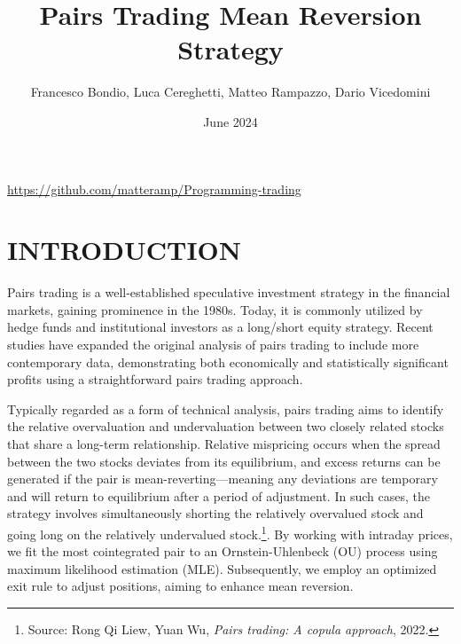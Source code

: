 \documentclass{article}
\title{Pairs Trading Mean Reversion Strategy}
\author{Francesco Bondio, Luca Cereghetti, Matteo Rampazzo, Dario Vicedomini}
\date{June 2024}
\begin{document}
\maketitle  %

\begin{center}
  \small \href{https://github.com/matteramp/Programming-trading}{https://github.com/matteramp/Programming-trading}
\end{center}


\section{INTRODUCTION}
Pairs trading is a well-established speculative investment strategy in the financial markets, gaining prominence in the 1980s. Today, it is commonly utilized by hedge funds and institutional investors as a long/short equity strategy. Recent studies have expanded the original analysis of pairs trading to include more contemporary data, demonstrating both economically and statistically significant profits using a straightforward pairs trading approach. 

Typically regarded as a form of technical analysis, pairs trading aims to identify the relative overvaluation and undervaluation between two closely related stocks that share a long-term relationship. Relative mispricing occurs when the spread between the two stocks deviates from its equilibrium, and excess returns can be generated if the pair is mean-reverting—meaning any deviations are temporary and will return to equilibrium after a period of adjustment. In such cases, the strategy involves simultaneously shorting the relatively overvalued stock and going long on the relatively undervalued stock.\footnote{Source: Rong Qi Liew, Yuan Wu, \textit{Pairs trading: A copula approach}, 2022.}. By working with intraday prices, we fit the most cointegrated pair to an Ornstein-Uhlenbeck (OU) process using maximum likelihood estimation (MLE). Subsequently, we employ an optimized exit rule to adjust positions, aiming to enhance mean reversion.
\end{document}
